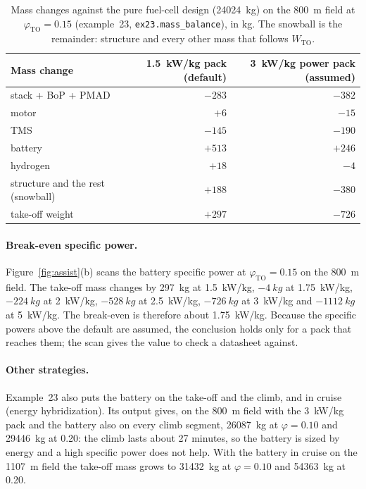 \documentclass[a4paper,11pt]{article}
\newcommand{\fn}[1]{\nolinkurl{#1}}
\begin{document}
\begin{table}[ht]
\centering\small
\caption{Mass changes against the pure fuel-cell design (\SI{24024}{kg}) on the \SI{800}{m}
field at $\varphi_\mathrm{TO}=0.15$ (example~23, \fn{ex23.mass_balance}), in kg. The snowball is
the remainder: structure and every other mass that follows $W_\mathrm{TO}$.}
\label{tab:assistbal}
\begin{tabular}{@{}lrr@{}}
\toprule
Mass change & \SI{1.5}{kW/kg} pack (default) & \SI{3}{kW/kg} power pack (assumed) \\
\midrule
stack + BoP + PMAD & $-283$ & $-382$ \\
motor & $+6$ & $-15$ \\
TMS & $-145$ & $-190$ \\
battery & $+513$ & $+246$ \\
hydrogen & $+18$ & $-4$ \\
structure and the rest (snowball) & $+188$ & $-380$ \\
\midrule
take-off weight & $+297$ & $-726$ \\
\bottomrule
\end{tabular}
\end{table}

\paragraph{Break-even specific power.} Figure~\ref{fig:assist}(b) scans the battery specific
power at $\varphi_\mathrm{TO}=0.15$ on the \SI{800}{m} field. The take-off mass changes by
\SI{297}{kg} at \SI{1.5}{kW/kg}, $-\SI{4}{kg}$ at \SI{1.75}{kW/kg}, $-\SI{224}{kg}$ at
\SI{2}{kW/kg}, $-\SI{528}{kg}$ at \SI{2.5}{kW/kg}, $-\SI{726}{kg}$ at \SI{3}{kW/kg} and
$-\SI{1112}{kg}$ at \SI{5}{kW/kg}. The break-even is therefore about \SI{1.75}{kW/kg}. Because
the specific powers above the default are assumed, the conclusion holds only for a pack that
reaches them; the scan gives the value to check a datasheet against.

\paragraph{Other strategies.} Example~23 also puts the battery on the take-off and the climb,
and in cruise (energy hybridization). Its output gives, on the \SI{800}{m} field with the
\SI{3}{kW/kg} pack and the battery also on every climb segment, \SI{26087}{kg} at $\varphi=0.10$
and \SI{29446}{kg} at 0.20: the climb lasts about 27 minutes, so the battery is sized by energy
and a high specific power does not help. With the battery in cruise on the \SI{1107}{m} field
the take-off mass grows to \SI{31432}{kg} at $\varphi=0.10$ and \SI{54363}{kg} at 0.20.
\end{document}
